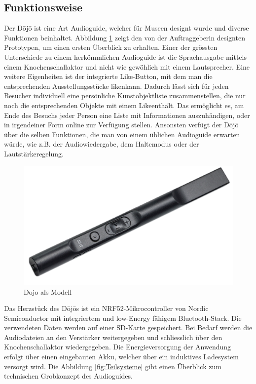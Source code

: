 \subsection{Funktionsweise} \label{sec:funktionsweise}
Der Dōjō ist eine Art Audioguide, welcher für Museen designt wurde und diverse Funktionen beinhaltet. Abbildung \ref{fig:Funktion Dojo} zeigt den von der Auftraggeberin designten Prototypen, um einen ersten Überblick zu erhalten. Einer der grössten Unterschiede zu einem herkömmlichen Audioguide ist die Sprachausgabe mittels einem Knochenschallaktor und nicht wie gewöhlich mit einem Lautsprecher. Eine weitere Eigenheiten ist der integrierte \glqq Like\grqq-Button, mit dem man die entsprechenden Ausstellungsstücke \glqq liken\grqq kann. Dadurch lässt sich für jeden Besucher individuell eine persönliche Kunstobjektliste zusammenstellen, die nur noch die entsprechenden Objekte mit einem \glqq Like\grqq enthält. Das ermöglicht es, am Ende des Besuchs jeder Person eine Liste mit Informationen auszuhändigen, oder in irgendeiner Form online zur Verfügung stellen. Ansonsten verfügt der Dōjō über die selben Funktionen, die man von einem üblichen Audioguide erwarten würde, wie z.B. der Audiowiedergabe, dem Haltemodus oder der Lautstärkeregelung.

\begin{figure}[H]
	\begin{center}
		\includegraphics[width=140mm]{data/Dojo.png}
		\caption[Dojo als Modell]{Dojo als Modell} %
		\label{fig:Funktion Dojo}
	\end{center}
\end{figure}

Das Herzstück des Dōjōs ist ein NRF52-Mikrocontroller von Nordic Semiconductor mit integriertem und low-Energy fähigem Bluetooth-Stack. Die verwendeten Daten werden auf einer SD-Karte gespeichert. Bei Bedarf werden die Audiodateien an den Verstärker weitergegeben und schliesslich über den Knochenschallaktor wiedergegeben. Die Energieversorgung der Anwendung erfolgt über einen eingebauten Akku, welcher über ein induktives Ladesystem versorgt wird. Die Abbildung \ref{fig:Teilsysteme} gibt einen Überblick zum technischen Grobkonzept des Audioguides.


